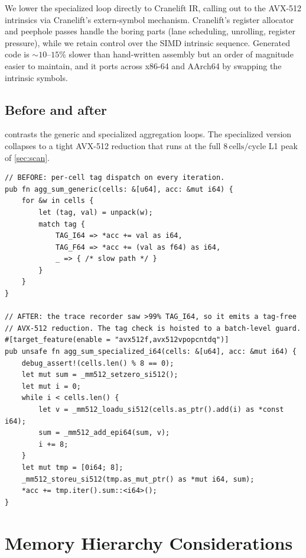 \documentclass[10pt]{article}
\theoremstyle{definition}
\begin{document}
We lower the specialized loop directly to Cranelift IR, calling out to the AVX-512 intrinsics via Cranelift's extern-symbol mechanism. Cranelift's register allocator and peephole passes handle the boring parts (lane scheduling, unrolling, register pressure), while we retain control over the SIMD intrinsic sequence. Generated code is $\sim\!10$--$15\%$ slower than hand-written assembly but an order of magnitude easier to maintain, and it ports across x86-64 and AArch64 by swapping the intrinsic symbols.

\subsection{Before and after}

 contrasts the generic and specialized aggregation loops. The specialized version collapses to a tight AVX-512 reduction that runs at the full $8\,\text{cells/cycle}$ L1 peak of \cref{sec:scan}.

\begin{lstlisting}[caption={Trace specialization: generic vs.\ monomorphic aggregation loop.},label={lst:trace}]
// BEFORE: per-cell tag dispatch on every iteration.
pub fn agg_sum_generic(cells: &[u64], acc: &mut i64) {
    for &w in cells {
        let (tag, val) = unpack(w);
        match tag {
            TAG_I64 => *acc += val as i64,
            TAG_F64 => *acc += (val as f64) as i64,
            _ => { /* slow path */ }
        }
    }
}

// AFTER: the trace recorder saw >99% TAG_I64, so it emits a tag-free
// AVX-512 reduction. The tag check is hoisted to a batch-level guard.
#[target_feature(enable = "avx512f,avx512vpopcntdq")]
pub unsafe fn agg_sum_specialized_i64(cells: &[u64], acc: &mut i64) {
    debug_assert!(cells.len() % 8 == 0);
    let mut sum = _mm512_setzero_si512();
    let mut i = 0;
    while i < cells.len() {
        let v = _mm512_loadu_si512(cells.as_ptr().add(i) as *const i64);
        sum = _mm512_add_epi64(sum, v);
        i += 8;
    }
    let mut tmp = [0i64; 8];
    _mm512_storeu_si512(tmp.as_mut_ptr() as *mut i64, sum);
    *acc += tmp.iter().sum::<i64>();
}
\end{lstlisting}

\section{Memory Hierarchy Considerations}
\end{document}
